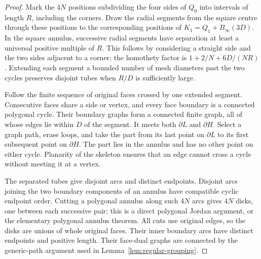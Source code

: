 \documentclass[11pt,a4paper]{article}
\theoremstyle{remark}
\begin{document}
\begin{proof}
Mark the $4N$ positions subdividing the four sides of $Q_0$ into intervals
of length $R$, including the corners.  Draw the radial segments from the
square centre through these positions to the corresponding positions of
$K_1=Q_1+B_\infty(3D)$.  In the square annulus, successive radial segments
have separation at least a universal positive multiple of $R$.  This
follows by considering a straight side and the two sides adjacent to a
corner; the homothety factor is $1+2/N+6D/(NR)$.  Extending each segment
a bounded number of mesh diameters past the two cycles preserves disjoint
tubes when $R/D$ is sufficiently large.

Follow the finite sequence of original faces crossed by one extended
segment.  Consecutive faces share a side or vertex, and every face boundary
is a connected polygonal cycle.  Their boundary graphs form a connected
finite graph, all of whose edges lie within $D$ of the segment.  It meets
both $\partial L$ and $\partial H$.  Select a graph path, erase loops,
and take the part from its last point on $\partial L$ to its first
subsequent point on $\partial H$.  The part lies in the annulus and has
no other point on either cycle.  Planarity of the skeleton ensures that
an edge cannot cross a cycle without meeting it at a vertex.

The separated tubes give disjoint arcs and distinct endpoints.  Disjoint
arcs joining the two boundary components of an annulus have compatible
cyclic endpoint order.  Cutting a polygonal annulus along such $4N$ arcs
gives $4N$ disks, one between each successive pair; this is a direct
polygonal Jordan argument, or the elementary polygonal annulus theorem.
All cuts use original edges, so the disks are unions of whole original
faces.  Their inner boundary arcs have distinct endpoints and positive
length.  Their face-dual graphs are connected by the generic-path argument
used in Lemma~\ref{lem:regular-grouping}.
\end{proof}
\end{document}
